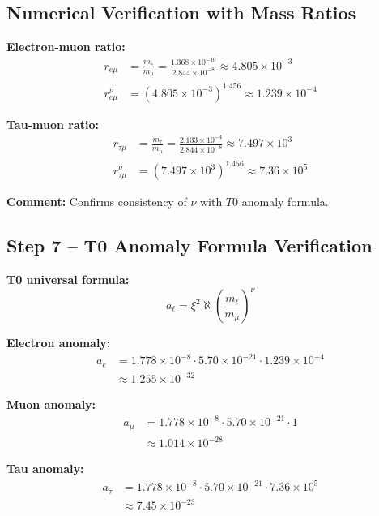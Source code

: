 \documentclass[12pt,a4paper]{article}
\newcommand{\xipar}{\xi}            %
\newcommand{\nulep}{\nu}            %
\begin{document}
\subsection{Numerical Verification with Mass Ratios}

\textbf{Electron-muon ratio:}
\begin{align}
	r_{e\mu} &= \frac{m_e}{m_\mu} = \frac{1.368 \times 10^{-10}}{2.844 \times 10^{-8}} \approx 4.805 \times 10^{-3} \\
	r_{e\mu}^{\nulep} &= (4.805 \times 10^{-3})^{1.456} \approx 1.239 \times 10^{-4}
\end{align}

\textbf{Tau-muon ratio:}
\begin{align}
	r_{\tau\mu} &= \frac{m_\tau}{m_\mu} = \frac{2.133 \times 10^{-4}}{2.844 \times 10^{-8}} \approx 7.497 \times 10^3 \\
	r_{\tau\mu}^{\nulep} &= (7.497 \times 10^3)^{1.456} \approx 7.36 \times 10^5
\end{align}

\textbf{Comment:} Confirms consistency of $\nulep$ with $T0$ anomaly formula.

\subsection{Step 7 – T0 Anomaly Formula Verification}

\textbf{T0 universal formula:}
\begin{equation}
	a_\ell = \xipar^2 \aleph \left(\frac{m_\ell}{m_\mu}\right)^\nulep
\end{equation}

\textbf{Electron anomaly:}
\begin{align}
	a_e &= 1.778 \times 10^{-8} \cdot 5.70 \times 10^{-21} \cdot 1.239 \times 10^{-4} \\
	&\approx 1.255 \times 10^{-32}
\end{align}

\textbf{Muon anomaly:}
\begin{align}
	a_\mu &= 1.778 \times 10^{-8} \cdot 5.70 \times 10^{-21} \cdot 1 \\
	&\approx 1.014 \times 10^{-28}
\end{align}

\textbf{Tau anomaly:}
\begin{align}
	a_\tau &= 1.778 \times 10^{-8} \cdot 5.70 \times 10^{-21} \cdot 7.36 \times 10^5 \\
	&\approx 7.45 \times 10^{-23}
\end{align}
\end{document}
